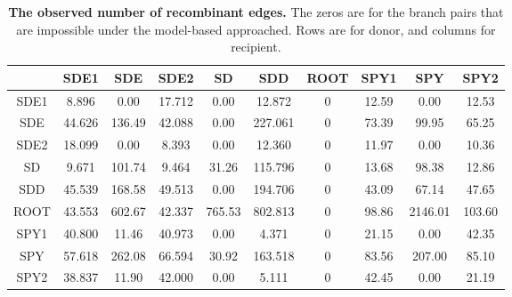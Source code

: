 \documentclass[10pt]{article}
\providecommand{\tabularnewline}{\\}
\begin{document}
\begin{table}[!ht]
\caption{
{\bf The observed number of recombinant edges.}
The zeros are for the branch pairs that are impossible under the model-based
approached. Rows are for donor, and columns for recipient.}
\noindent \centering{}\begin{tabular}{cccccccccc}
\hline
& SDE1 & SDE & SDE2 & SD & SDD & ROOT & SPY1 & SPY & SPY2 \tabularnewline
\hline
SDE1&8.896 &  0.00 &17.712  & 0.00 & 12.872   & 0 &12.59  &  0.00  &12.53\tabularnewline
SDE &44.626& 136.49& 42.088 &  0.00& 227.061  &  0& 73.39 &  99.95 & 65.25\tabularnewline
SDE2&18.099&   0.00&  8.393 &  0.00&  12.360  &  0& 11.97 &   0.00 & 10.36\tabularnewline
SD  &9.671 &101.74 & 9.464  &31.26 &115.796   & 0 &13.68  & 98.38  &12.86\tabularnewline
SDD &45.539& 168.58& 49.513 &  0.00& 194.706  &  0& 43.09 &  67.14 & 47.65\tabularnewline
ROOT&43.553& 602.67& 42.337 &765.53& 802.813  &  0& 98.86 &2146.01 &103.60\tabularnewline
SPY1&40.800&  11.46& 40.973 &  0.00&   4.371  &  0& 21.15 &   0.00 & 42.35\tabularnewline
SPY &57.618& 262.08& 66.594 & 30.92& 163.518  &  0& 83.56 & 207.00 & 85.10\tabularnewline
SPY2&38.837&  11.90& 42.000 &  0.00&   5.111  &  0& 42.45 &   0.00 & 21.19\tabularnewline
\hline
\end{tabular}
\label{tab:obsheatmap}
\end{table}
\end{document}
